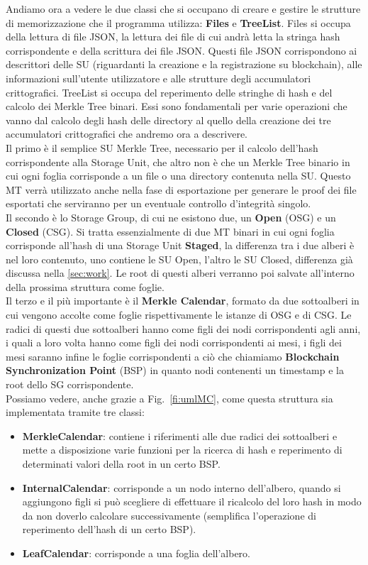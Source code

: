 Andiamo ora a vedere le due classi che si occupano di creare e gestire le strutture di memorizzazione che il programma utilizza: \textbf{Files} e \textbf{TreeList}.
Files si occupa della lettura di file JSON, la lettura dei file di cui andrà letta la stringa hash corrispondente e della scrittura dei file JSON. Questi file JSON corrispondono ai descrittori delle SU (riguardanti la creazione e la registrazione su blockchain), alle informazioni sull’utente utilizzatore e alle strutture degli accumulatori crittografici.
\newpage
TreeList si occupa del reperimento delle stringhe di hash e del calcolo dei Merkle Tree binari.
Essi sono fondamentali per varie operazioni che vanno dal calcolo degli hash delle directory al quello della creazione dei tre accumulatori crittografici che andremo ora a descrivere.
\\ Il primo è il semplice SU Merkle Tree, necessario per il calcolo dell’hash corrispondente alla Storage Unit, che altro non è che un Merkle Tree binario in cui ogni foglia corrisponde a un file o una directory contenuta nella SU. Questo MT verrà utilizzato anche nella fase di esportazione per generare le proof dei file esportati che serviranno per un eventuale controllo d’integrità singolo.
\\ Il secondo è lo Storage Group, di cui ne esistono due, un \textbf{Open} (OSG) e un \textbf{Closed} (CSG). Si tratta essenzialmente di due MT binari in cui ogni foglia corrisponde all’hash di una Storage Unit \textbf{Staged}, la differenza tra i due alberi è nel loro contenuto, uno contiene le SU Open, l’altro le SU Closed, differenza già discussa nella \autoref{sec:work}. Le root di questi alberi verranno poi salvate all’interno della prossima struttura come foglie.
\\ Il terzo e il più importante è il \textbf{Merkle Calendar}, formato da due sottoalberi in cui vengono accolte come foglie rispettivamente le istanze di OSG e di CSG. Le radici di questi due sottoalberi hanno come figli dei nodi corrispondenti agli anni, i quali a loro volta hanno come figli dei nodi corrispondenti ai mesi, i figli dei mesi saranno infine le foglie corrispondenti a ciò che chiamiamo \textbf{Blockchain Synchronization Point} (BSP) in quanto nodi contenenti un timestamp e la root dello SG corrispondente.
\\
Possiamo vedere, anche grazie a Fig.~\ref{fi:umlMC}, come questa struttura sia implementata tramite tre classi:

\begin{itemize}
    \item \textbf{MerkleCalendar}: contiene i riferimenti alle due radici dei sottoalberi e mette a disposizione varie funzioni per la ricerca di hash e reperimento di determinati valori della root in un certo BSP.
    \item \textbf{InternalCalendar}: corrisponde a un nodo interno dell’albero, quando si aggiungono figli si può scegliere di effettuare il ricalcolo del loro hash in modo da non doverlo calcolare successivamente (semplifica l’operazione di reperimento dell’hash di un certo BSP).
    \item \textbf{LeafCalendar}: corrisponde a una foglia dell’albero.
\end{itemize}


